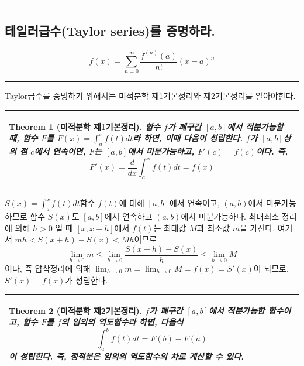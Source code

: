 \documentclass{article}
\numberwithin{equation}{section}
\newtheorem{theorem}{Theorem}[section]
\newenvironment{proof1}[1][Proof]{\begin{trivlist}
\item[\hskip \labelsep {\bfseries #1}]}{\end{trivlist}}
\theoremstyle{examplestyle}
\begin{document}
\rule{\textwidth}{0.1pt}

\subsection{테일러급수(Taylor series)를 증명하라.}
\begin{equation*}
f(x)=\sum_{n=0}^{\infty}\frac{f^{(n)}(a)}{n!}(x-a)^{n}
\end{equation*}
\rule{\textwidth}{0.1pt}
Taylor급수를 증명하기 위해서는 미적분학 제1기본정리와 제2기본정리를 알아야한다.\\
\begin{tabular}[c]{|p{\textwidth}|}
\hline
\begin{theorem}[미적분학 제1기본정리]
함수 $f$가 폐구간 $[a,b]$에서 적분가능할 때, 함수 $F$를 $F(x)=\int_{a}^{x}f(t)dt$라 하면, 이때 다음이 성립한다.
$f$가 $[a,b]$상의 점 $c$에서 연속이면, $F$는 $[a,b]$에서 미분가능하고, $F'(c) = f(c)$이다. 즉,
\begin{equation}
F'(x)=\frac{d}{dx}\int_{a}^{x}f(t)dt=f(x)
\end{equation}
\end{theorem}
\\\hline
\end{tabular}

\begin{proof1}
$S(x)=\int_{a}^{x}f(t)dt$함수 $f(t)$에 대해 $[a,b]$에서 연속이고, $(a,b)$에서 미분가능하므로 함수 $S(x)$도 $[a,b]$에서 연속하고 $(a,b)$에서 미분가능하다.
최대최소 정리에 의해 $h>0$ 일 때 $[x, x+h]$에서 $f(t)$는 최대값 $M$과 최소값 $m$을 가진다.
여기서 $mh<S(x+h)-S(x)<Mh$이므로 
\begin{equation*}
\lim_{h\rightarrow0}m\leq\lim_{h\rightarrow0}\frac{S(x+h)-S(x)}{h}\leq\lim_{h\rightarrow0}M
\end{equation*}
이다, 즉 압착정리에 의해 $\lim_{h\rightarrow0}m=\lim_{h\rightarrow0}M=f(x)=S'(x)$이 되므로, $S'(x)=f(x)$가 성립한다.
\end{proof1}
\begin{tabular}[c]{|p{\textwidth}|}
\hline
\begin{theorem}[미적분학 제2기본정리]
$f$가 폐구간 $[a,b]$에서 적분가능한 함수이고, 함수 $F$를 $f$의 임의의 역도함수라 하면, 다음식
\begin{equation}
\int_{a}^{b}f(t)dt=F(b)-F(a)
\end{equation}
이 성립한다. 즉, 정적분은 임의의 역도함수의 차로 계산할 수 있다.
\end{theorem}
\\\hline
\end{tabular}
\end{document}
